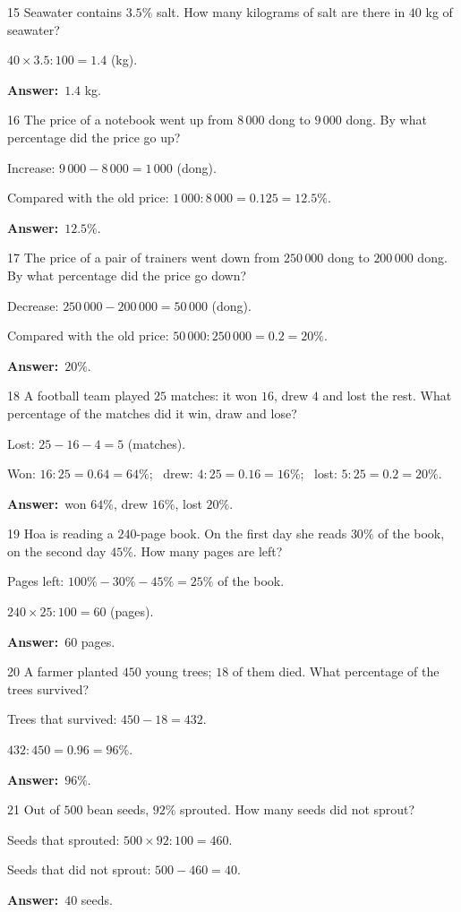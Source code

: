 \documentclass[11pt]{article}
\newif\ifsol \solfalse
\providecommand{\AnsWord}{Đáp số}
\newcommand{\dapso}[1]{\par\textbf{\AnsWord:}\ #1}
\newcommand{\probsol}[1]{%
  \begin{lrbox}{\solmeasure}\begin{minipage}{\dimexpr\linewidth-24pt\relax}#1\end{minipage}\end{lrbox}%
  \ifsol
    \begin{solbox}#1\end{solbox}%
  \else
    \setlength{\solht}{\dimexpr\ht\solmeasure+\dp\solmeasure+0.85cm\relax}%
    \ifdim\solht<1.35cm\setlength{\solht}{1.35cm}\fi
    \begin{tcolorbox}[colback=white,colframe=Line,boxrule=0.8pt,arc=5pt,
      left=8pt,right=8pt,top=4pt,bottom=4pt,height=\solht]{\footnotesize\color{Slate}\itshape\WorkWord}\end{tcolorbox}%
  \fi}
\newcommand{\gap}{\vspace{0.3cm}}
\def\WorkWord{Your work:}
\def\AnsWord{Answer}
\begin{document}
\gap
\begin{probbox}{15}{\relax}
Seawater contains $3.5\%$ salt. How many kilograms of salt are there in $40$ kg of seawater?
\end{probbox}
\probsol{
$40\times3.5:100=1.4$ (kg).
\dapso{$1.4$ kg.}}
\gap
\begin{probbox}{16}{\relax}
The price of a notebook went up from $8\,000$ dong to $9\,000$ dong. By what percentage did the price go up?
\end{probbox}
\probsol{
Increase: $9\,000-8\,000=1\,000$ (dong).\par
Compared with the old price: $1\,000:8\,000=0.125=12.5\%$.
\dapso{$12.5\%$.}}
\gap
\begin{probbox}{17}{\relax}
The price of a pair of trainers went down from $250\,000$ dong to $200\,000$ dong. By what percentage did the price go down?
\end{probbox}
\probsol{
Decrease: $250\,000-200\,000=50\,000$ (dong).\par
Compared with the old price: $50\,000:250\,000=0.2=20\%$.
\dapso{$20\%$.}}
\gap
\begin{probbox}{18}{\relax}
A football team played $25$ matches: it won $16$, drew $4$ and lost the rest. What percentage of the matches did it win, draw and lose?
\end{probbox}
\probsol{
Lost: $25-16-4=5$ (matches).\par
Won: $16:25=0.64=64\%$; \ drew: $4:25=0.16=16\%$; \ lost: $5:25=0.2=20\%$.
\dapso{won $64\%$, drew $16\%$, lost $20\%$.}}
\gap
\begin{probbox}{19}{\relax}
Hoa is reading a $240$-page book. On the first day she reads $30\%$ of the book, on the second day $45\%$. How many pages are left?
\end{probbox}
\probsol{
Pages left: $100\%-30\%-45\%=25\%$ of the book.\par
$240\times25:100=60$ (pages).
\dapso{$60$ pages.}}
\gap
\begin{probbox}{20}{\relax}
A farmer planted $450$ young trees; $18$ of them died. What percentage of the trees survived?
\end{probbox}
\probsol{
Trees that survived: $450-18=432$.\par
$432:450=0.96=96\%$.
\dapso{$96\%$.}}
\gap
\begin{probbox}{21}{\relax}
Out of $500$ bean seeds, $92\%$ sprouted. How many seeds did not sprout?
\end{probbox}
\probsol{
Seeds that sprouted: $500\times92:100=460$.\par
Seeds that did not sprout: $500-460=40$.
\dapso{$40$ seeds.}}
\end{document}
